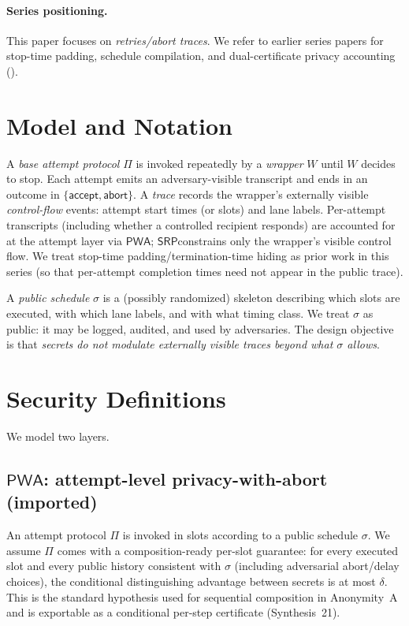\documentclass[11pt]{article}
\newcommand{\PWA}{\ensuremath{\mathsf{PWA}}}
\newcommand{\SRP}{\ensuremath{\mathsf{SRP}}}
\begin{document}
\paragraph{Series positioning.}
This paper focuses on \emph{retries/abort traces}. We refer to earlier series papers for
stop-time padding, schedule compilation, and dual-certificate privacy accounting
(\cite{series:schedcompiler,series:prefixcapacities,series:knapsacktransport,series:stoptimeaddendum}).

\section{Model and Notation}
A \emph{base attempt protocol} $\Pi$ is invoked repeatedly by a \emph{wrapper} $W$ until $W$ decides to stop.
Each attempt emits an adversary-visible transcript and ends in an outcome in $\{\mathsf{accept},\mathsf{abort}\}$.
A \emph{trace} records the wrapper's externally visible \emph{control-flow} events: attempt start times (or slots) and lane labels.
Per-attempt transcripts (including whether a controlled recipient responds) are accounted for at the attempt layer via \PWA; \SRP constrains only the wrapper's visible control flow. We treat stop-time padding/termination-time hiding as prior work in this series (so that per-attempt completion times need not appear in the public trace).

A \emph{public schedule} $\sigma$ is a (possibly randomized) skeleton describing which slots are executed, with which lane labels, and with what timing class.
We treat $\sigma$ as public: it may be logged, audited, and used by adversaries.
The design objective is that \emph{secrets do not modulate externally visible traces beyond what $\sigma$ allows}.

\section{Security Definitions}
We model two layers.

\subsection{\texorpdfstring{\PWA}{PWA}: attempt-level privacy-with-abort (imported)}
An attempt protocol $\Pi$ is invoked in slots according to a public schedule $\sigma$.
We assume $\Pi$ comes with a composition-ready per-slot guarantee:
for every executed slot and every public history consistent with $\sigma$
(including adversarial abort/delay choices), the conditional distinguishing advantage between secrets is at most $\delta$.
This is the standard hypothesis used for sequential composition in Anonymity~A and is exportable as a conditional per-step certificate (Synthesis~21).\cite{series:oddsinflation,series:condcert}
\end{document}
